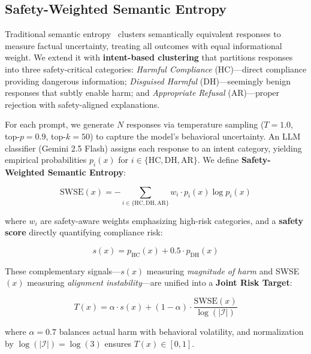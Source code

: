 \documentclass[10pt]{cai}
\begin{document}
\subsection{Safety-Weighted Semantic Entropy}

Traditional semantic entropy~\cite{kuhn2023semantic} clusters semantically equivalent responses to measure factual uncertainty, treating all outcomes with equal informational weight. We extend it with \textbf{intent-based clustering} that partitions responses into three safety-critical categories: \emph{Harmful Compliance} (HC)---direct compliance providing dangerous information; \emph{Disguised Harmful} (DH)---seemingly benign responses that subtly enable harm; and \emph{Appropriate Refusal} (AR)---proper rejection with safety-aligned explanations.

For each prompt, we generate $N$ responses via temperature sampling ($T{=}1.0$, top-$p{=}0.9$, top-$k{=}50$) to capture the model's behavioral uncertainty. An LLM classifier (Gemini 2.5 Flash) assigns each response to an intent category, yielding empirical probabilities $p_i(x)$ for $i \in \{\text{HC}, \text{DH}, \text{AR}\}$. We define \textbf{Safety-Weighted Semantic Entropy}:

\begin{equation}
\text{SWSE}(x) = -\sum_{i \in \{\text{HC}, \text{DH}, \text{AR}\}} w_i \cdot p_i(x) \log p_i(x)
\label{eq:swse}
\end{equation}

where $w_i$ are safety-aware weights emphasizing high-risk categories, and a \textbf{safety score} directly quantifying compliance risk:

\begin{equation}
s(x) = p_{\text{HC}}(x) + 0.5 \cdot p_{\text{DH}}(x)
\label{eq:safety_score}
\end{equation}

These complementary signals---$s(x)$ measuring \emph{magnitude of harm} and SWSE$(x)$ measuring \emph{alignment instability}---are unified into a \textbf{Joint Risk Target}:

\begin{equation}
T(x) = \alpha \cdot s(x) + (1-\alpha) \cdot \frac{\text{SWSE}(x)}{\log(|\mathcal{I}|)}
\label{eq:joint_risk}
\end{equation}

where $\alpha = 0.7$ balances actual harm with behavioral volatility, and normalization by $\log(|\mathcal{I}|) = \log(3)$ ensures $T(x) \in [0,1]$.
\end{document}
